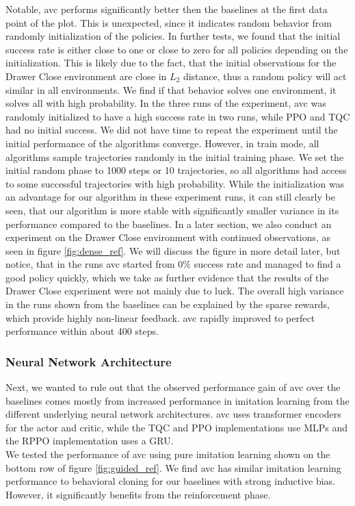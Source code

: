 Notable, \ac{avc} performs significantly better then the baselines at the first data point of the plot. This is unexpected, since it indicates 
random behavior from randomly initialization of the policies. In further tests, we found that the initial success rate is either close to one or close to zero for all policies depending 
on the initialization. This is likely 
due to the fact, that the initial observations for the Drawer Close environment are close in $L_2$ distance, thus a random policy will act similar in all environments. We find if that behavior 
solves one environment, it solves all with high probability. In the three runs of the experiment, \ac{avc} was randomly initialized to have a high success rate in two runs, while PPO and TQC had no 
initial success. We did not have time to repeat the experiment until the initial performance of the algorithms converge. However, in train mode, 
all algorithms sample trajectories randomly in the initial training phase. 
We set the initial random phase to 1000 steps or 10 trajectories, so all algorithms had access to some successful trajectories with high probability. While the initialization was an advantage 
for our algorithm in these experiment runs, it can still clearly be seen, that our algorithm is more stable with significantly smaller variance in its performance compared to the baselines. In a later 
section, we also conduct an experiment on the Drawer Close environment with continued observations, as seen in figure \ref{fig:dense_ref}. We will discuss the figure in more detail later, but 
notice, that in the runs \ac{avc} started from $0 \%$ success rate and managed to find a good policy quickly, which we take as further evidence that the results of the Drawer Close experiment were not 
mainly due to luck. The overall high variance in the runs shown from the baselines can be explained by the sparse rewards, which provide highly non-linear feedback. 
\ac{avc} rapidly improved to perfect performance within about 400 steps. \\

\subsubsection{Neural Network Architecture}
Next, we wanted to rule out that the observed performance gain of \ac{avc} over the baselines comes mostly from increased performance in imitation learning 
from the different underlying neural network architectures. \ac{avc} uses transformer encoders for the actor and 
critic, while the TQC and PPO implementations use MLPs and the RPPO implementation uses a GRU.\\ 
We tested the performance of \ac{avc} using pure imitation learning shown on the bottom row of
figure \ref{fig:guided_ref}. We find \ac{avc} has similar imitation learning performance to behavioral cloning for our baselines with strong inductive bias. However, it significantly benefits from the reinforcement phase.\\

